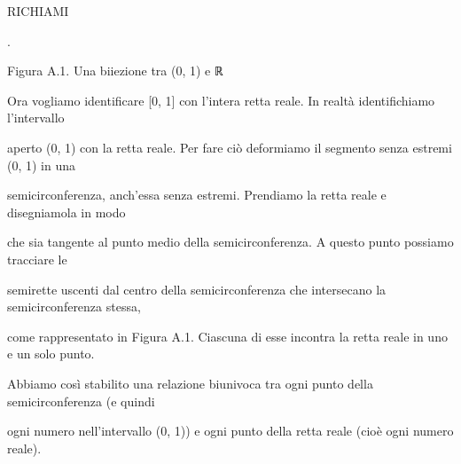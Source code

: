 \documentclass[a4paper,portrait,12pt]{article}
\begin{document}





\begin{flushleft}
RICHIAMI
\end{flushleft}





.





\begin{flushleft}
Figura A.1. Una biiezione tra (0, 1) e ℝ
\end{flushleft}





\begin{flushleft}
Ora vogliamo identificare [0, 1] con l'intera retta reale. In realt\`{a} identifichiamo l'intervallo
\end{flushleft}


\begin{flushleft}
aperto (0, 1) con la retta reale. Per fare ci\`{o} deformiamo il segmento senza estremi (0, 1) in una
\end{flushleft}


\begin{flushleft}
semicirconferenza, anch'essa senza estremi. Prendiamo la retta reale e disegniamola in modo
\end{flushleft}


\begin{flushleft}
che sia tangente al punto medio della semicirconferenza. A questo punto possiamo tracciare le
\end{flushleft}


\begin{flushleft}
semirette uscenti dal centro della semicirconferenza che intersecano la semicirconferenza stessa,
\end{flushleft}


\begin{flushleft}
come rappresentato in Figura A.1. Ciascuna di esse incontra la retta reale in uno e un solo punto.
\end{flushleft}


\begin{flushleft}
Abbiamo così stabilito una relazione biunivoca tra ogni punto della semicirconferenza (e quindi
\end{flushleft}


\begin{flushleft}
ogni numero nell'intervallo (0, 1)) e ogni punto della retta reale (cio\`{e} ogni numero reale).
\end{flushleft}
\end{document}
